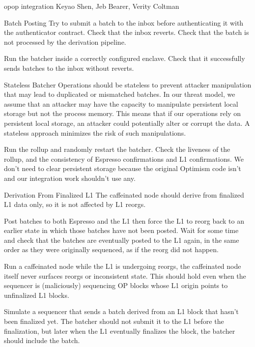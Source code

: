 \begin{requirementspage}{op}{op integration}{
    Keyao Shen, Jeb Bearer, Verity Coltman
}
\begin{requirement}{Batch Posting}
        \acceptance Try to submit a batch to the inbox before authenticating it with the
        authenticator contract. Check that the inbox reverts. Check that the batch is not processed
        by the derivation pipeline.

        \acceptance Run the batcher inside a correctly configured enclave. Check that it
        successfully sends batches to the inbox without reverts.
    \end{requirement}

    \begin{requirement}{Stateless Batcher}
        Operations should be stateless to prevent attacker manipulation that may lead to duplicated
        or mismatched batches. In our threat model, we assume that an attacker may have the capacity
        to manipulate persistent local storage but not the process memory. This means that if our
        operations rely on persistent local storage, an attacker could potentially alter or corrupt
        the data. A stateless approach minimizes the risk of such manipulations.

        \acceptance Run the rollup and randomly restart the batcher. Check the liveness of the
        rollup, and the consistency of Espresso confirmations and L1 confirmations. We don't need
        to clear persistent storage because the original Optimism code isn't and our integration
        work shouldn't use any.
    \end{requirement}

    \begin{requirement}{Derivation From Finalized L1} \label{derivation-from-finalized-l1}
        The caffeinated node should derive from finalized L1 data only, so it is not affected by L1
        reorgs.

        \acceptance Post batches to both Espresso and the L1 then force the L1 to reorg back to an
        earlier state in which those batches have not been posted. Wait for some time and check
        that the batches are eventually posted to the L1 again, in the same order as they were
        originally sequenced, as if the reorg did not happen.

        \acceptance Run a caffeinated node while the L1 is undergoing reorgs, the caffeinated node
        itself never surfaces reorgs or inconsistent state. This should hold even when the
        sequencer is (maliciously) sequencing OP blocks whose L1 origin points to unfinalized L1
        blocks.

        \acceptance Simulate a sequencer that sends a batch derived from an L1 block that hasn't
        been finalized yet. The batcher should not submit it to the L1 before the finalization,
        but later when the L1 eventually finalizes the block, the batcher should include the batch.


\end{requirement}
\end{requirementspage}
